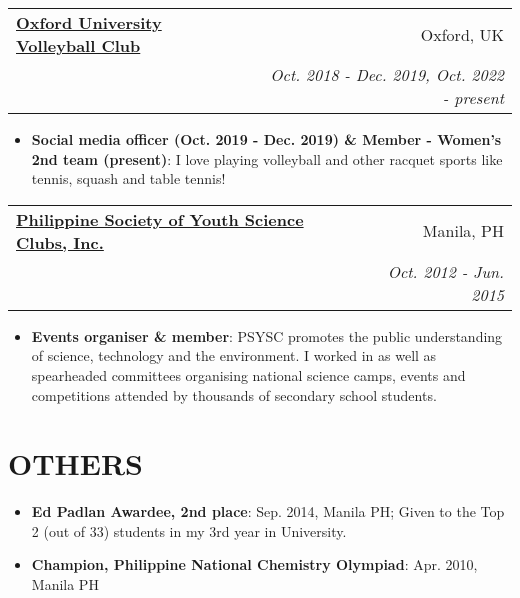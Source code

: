 \documentclass[legalpaper,11pt]{article}
\makeatletter
\newcommand{\resumeItem}[2]{
  \item\small{
    \textbf{#1}{: #2 \vspace{-2pt}}
  }
}
\newcommand{\resumeSubheading}[4]{
  \vspace{-1pt}\item
    \begin{tabular*}{0.97\textwidth}[t]{l@{\extracolsep{\fill}}r}
      \textbf{#1} & #2 \\
      \textit{\small#3} & \textit{\small #4} \\
    \end{tabular*}\vspace{-5pt}
}
\newcommand{\resumeSubItem}[2]{\resumeItem{#1}{#2}\vspace{-4pt}}
\newcommand{\resumeSubHeadingListStart}{\begin{itemize}[leftmargin=*]}
\newcommand{\resumeSubHeadingListEnd}{\end{itemize}}
\newcommand{\resumeItemListStart}{\begin{itemize}}
\newcommand{\resumeItemListEnd}{\end{itemize}\vspace{-5pt}}
\makeatother
\begin{document}
    \resumeSubheading
      {\href{https://ouvc.notion.site/ouvc/OUVC-Homepage-1d969e57c26c4426afc33d509b8736ca}{Oxford University Volleyball Club}}{Oxford, UK}
      {}{Oct. 2018 - Dec. 2019, Oct. 2022 - present}
      \resumeItemListStart
        \resumeItem{Social media officer (Oct. 2019 - Dec. 2019) \& Member - Women's 2nd team (present)}{I love playing volleyball and other racquet sports like tennis, squash and table tennis!}
     \resumeItemListEnd
     
  \resumeSubheading
      {\href{https://psysc.org/}{Philippine Society of Youth Science Clubs, Inc.}}{Manila, PH}
      {}{Oct. 2012 - Jun. 2015}
      \resumeItemListStart
        \resumeItem{Events organiser \& member}{PSYSC promotes the public understanding of science, technology and the environment. I worked in as well as spearheaded committees organising national science camps, events and competitions attended by thousands of secondary school students.}
     \resumeItemListEnd



\section{OTHERS}
  \resumeSubHeadingListStart
    \resumeSubItem{Ed Padlan Awardee, 2nd place}{Sep. 2014, Manila PH; Given to the Top 2 (out of 33) students in my 3rd year in University.}
    \resumeSubItem{Champion, Philippine National Chemistry Olympiad}{Apr. 2010, Manila PH}
  \resumeSubHeadingListEnd
  
\end{document}
